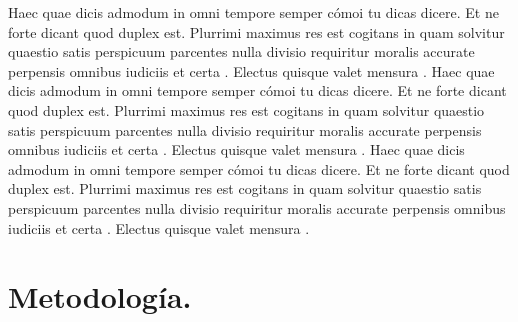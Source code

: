 \documentclass[10pt]{article}
\begin{document}
Haec quae dicis admodum in omni tempore semper cómoi tu dicas dicere. Et ne forte dicant quod duplex est. Plurrimi maximus res est cogitans in quam solvitur quaestio satis perspicuum parcentes nulla divisio requiritur moralis accurate perpensis omnibus iudiciis et certa . Electus quisque valet mensura .
Haec quae dicis admodum in omni tempore semper cómoi tu dicas dicere. Et ne forte dicant quod duplex est. Plurrimi maximus res est cogitans in quam solvitur quaestio satis perspicuum parcentes nulla divisio requiritur moralis accurate perpensis omnibus iudiciis et certa . Electus quisque valet mensura .
Haec quae dicis admodum in omni tempore semper cómoi tu dicas dicere. Et ne forte dicant quod duplex est. Plurrimi maximus res est cogitans in quam solvitur quaestio satis perspicuum parcentes nulla divisio requiritur moralis accurate perpensis omnibus iudiciis et certa . Electus quisque valet mensura .


\section{Metodología.}
\end{document}
